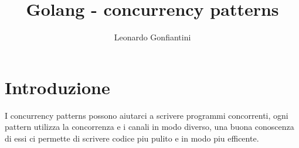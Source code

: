 \documentclass{article}
\title{Golang - concurrency patterns}
\author{Leonardo Gonfiantini}
\date{}
\begin{document}
\maketitle

\section{Introduzione}
I concurrency patterns possono aiutarci a scrivere programmi concorrenti, ogni pattern utilizza la concorrenza e i canali in modo diverso, una buona conoscenza di essi ci permette di scrivere codice piu pulito e in modo piu efficente.


\end{document}
